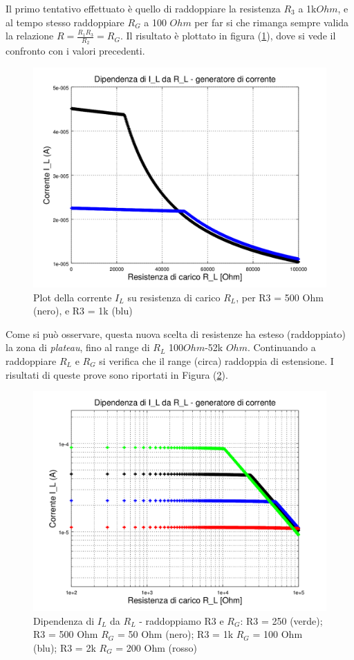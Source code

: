 \documentclass[journal, a4paper]{IEEEtran}
\begin{document}
Il primo tentativo effettuato è quello di raddoppiare la resistenza $R_3$ a 1k$\si{Ohm}$, e al tempo stesso raddoppiare $R_G$ a 100 $\si{Ohm}$ per far si che rimanga sempre valida la relazione $R = \frac{R_1 R_3 }{R_2}= R_G$. Il risultato è plottato in figura (\ref{fig:corrente_carico_res_carico_R3_500-1k_linear}), dove si vede il confronto con i valori precedenti.

\begin{figure}
\centering
\includegraphics[width=0.7\linewidth]{./corrente_carico_res_carico_R3_500-1k_linear}
\caption{Plot della corrente $I_L$ su resistenza di carico $R_L$, per R3 = 500 Ohm (nero), e R3 = 1k (blu)}
\label{fig:corrente_carico_res_carico_R3_500-1k_linear}
\end{figure}


Come si può osservare, questa nuova scelta di resistenze ha esteso (raddoppiato) la zona di \textit{plateau}, fino al range di $R_L$ 100$\si{Ohm}$-52k $\si{Ohm}$. Continuando a raddoppiare $R_L$ e $R_G$ si verifica che il range (circa) raddoppia di estensione. I risultati di queste prove sono riportati in Figura (\ref{fig:corrente_carico_res_carico_R3_500-1k-2k-250_loglog}).

\begin{figure}
\centering
\includegraphics[width=0.7\linewidth]{./corrente_carico_res_carico_R3_500-1k-2k-250_loglog}
\caption{Dipendenza di $I_L$ da $R_L$ - raddoppiamo R3 e $R_G$: R3 = 250 (verde); R3 = 500 Ohm $R_G$ = 50 Ohm (nero); R3 = 1k $R_G$ = 100 Ohm (blu); R3 = 2k $R_G$ = 200 Ohm (rosso)}
\label{fig:corrente_carico_res_carico_R3_500-1k-2k-250_loglog}
\end{figure}
\end{document}

